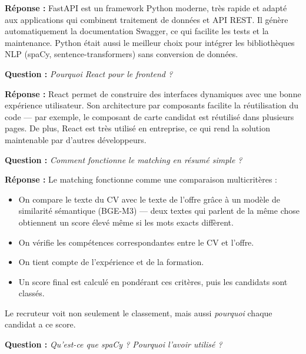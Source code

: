 \documentclass[12pt,a4paper]{article}
\newenvironment{jury}{%
  \def\FrameCommand{\fboxsep=8pt\colorbox{orange!12}}%
  \MakeFramed{\advance\hsize-\width \FrameRestore}%
  \vspace{-4pt}%
}{\endMakeFramed}
\newenvironment{reponse}{%
  \def\FrameCommand{\fboxsep=8pt\colorbox{green!10}}%
  \MakeFramed{\advance\hsize-\width \FrameRestore}%
  \vspace{-4pt}%
}{\endMakeFramed}
\newcommand{\Q}[1]{\vspace{6pt}\noindent\textbf{\color{orange}Question :} \textit{#1}}
\newcommand{\R}[1]{\noindent\textbf{\color{vert}Réponse :} #1\vspace{6pt}}
\begin{document}
\begin{reponse}
\R{FastAPI est un framework Python moderne, très rapide et adapté aux applications qui combinent traitement de données et API REST.
Il génère automatiquement la documentation Swagger, ce qui facilite les tests et la maintenance.
Python était aussi le meilleur choix pour intégrer les bibliothèques NLP (spaCy, sentence-transformers) sans conversion de données.}
\end{reponse}

\begin{jury}
\Q{Pourquoi React pour le frontend ?}
\end{jury}

\begin{reponse}
\R{React permet de construire des interfaces dynamiques avec une bonne expérience utilisateur.
Son architecture par composants facilite la réutilisation du code — par exemple, le composant de carte candidat est réutilisé dans plusieurs pages.
De plus, React est très utilisé en entreprise, ce qui rend la solution maintenable par d'autres développeurs.}
\end{reponse}

\begin{jury}
\Q{Comment fonctionne le matching en résumé simple ?}
\end{jury}

\begin{reponse}
\R{Le matching fonctionne comme une comparaison multicritères :
\begin{itemize}[leftmargin=1.5cm]
  \item On compare le texte du CV avec le texte de l'offre grâce à un modèle de similarité sémantique (BGE-M3) — deux textes qui parlent de la même chose obtiennent un score élevé même si les mots exacts diffèrent.
  \item On vérifie les compétences correspondantes entre le CV et l'offre.
  \item On tient compte de l'expérience et de la formation.
  \item Un score final est calculé en pondérant ces critères, puis les candidats sont classés.
\end{itemize}
Le recruteur voit non seulement le classement, mais aussi \textit{pourquoi} chaque candidat a ce score.}
\end{reponse}

\begin{jury}
\Q{Qu'est-ce que spaCy ? Pourquoi l'avoir utilisé ?}
\end{jury}
\end{document}
